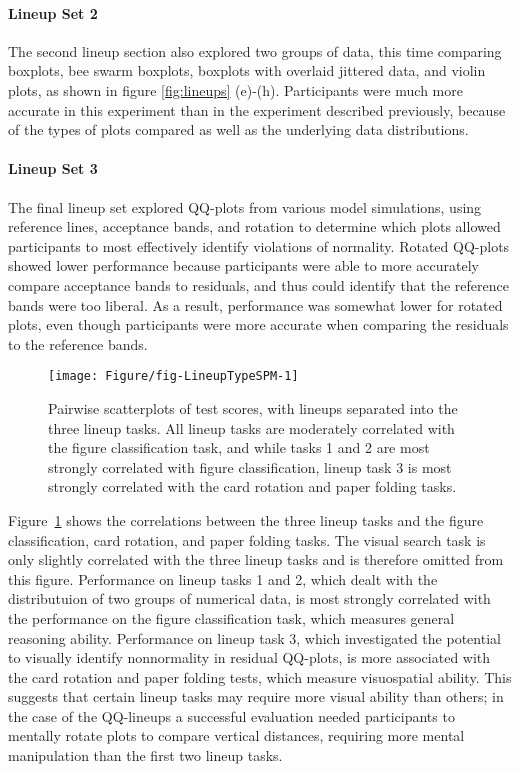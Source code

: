 \documentclass[journal]{vgtc}\usepackage[]{graphicx}\usepackage[]{color}
\begin{document}
\paragraph{Lineup Set 2}
The second lineup section also explored two groups of data, this time comparing boxplots, bee swarm boxplots, boxplots with overlaid jittered data, and violin plots, as shown in figure \ref{fig:lineups} (e)-(h). Participants were much more accurate in this experiment than in the experiment described previously, because of the types of plots compared as well as the underlying data distributions. 

\paragraph{Lineup Set 3}
The final lineup set explored QQ-plots from various model simulations, using reference lines, acceptance bands, and rotation to determine which plots allowed participants to most effectively identify violations of normality. Rotated QQ-plots showed lower performance because participants were able to more accurately compare acceptance bands to residuals, and thus could identify that the reference bands were too liberal. As a result, performance was somewhat lower for rotated plots, even though participants were more accurate when comparing the residuals to the reference bands.



\begin{figure}[ht]
\texttt{[image: Figure/fig-LineupTypeSPM-1]}
\caption{Pairwise scatterplots of test scores, with lineups separated into the three lineup tasks. All lineup tasks are moderately correlated with the figure classification task, and while tasks 1 and 2 are most strongly correlated with figure classification, lineup task 3 is most strongly correlated with the card rotation and paper folding tasks. \label{fig:lineuptaskmatrix}}
\end{figure}
Figure~\ref{fig:lineuptaskmatrix} shows the correlations between the three lineup tasks and the figure classification, card rotation, and paper folding tasks. The visual search task is only slightly correlated with the three lineup tasks and is therefore omitted from this figure. Performance on lineup tasks 1 and 2, which dealt with the distributuion of two groups of numerical data, is most strongly correlated with the performance on the figure classification task, which measures general reasoning ability.
Performance on lineup task 3, which investigated the potential to visually identify nonnormality in residual QQ-plots, is more associated with the card rotation and paper folding tests, which measure visuospatial ability. This suggests that certain lineup tasks may require more visual ability than others; in the case of the QQ-lineups a successful evaluation  needed  participants to mentally rotate plots to compare vertical distances, requiring more mental manipulation than the first two lineup tasks.
\end{document}
